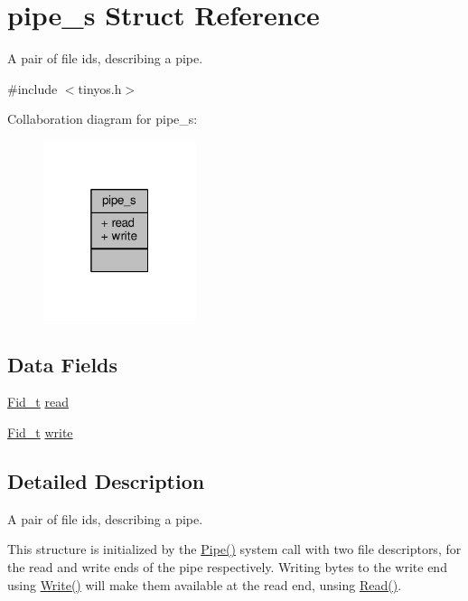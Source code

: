 \hypertarget{structpipe__s}{}\section{pipe\+\_\+s Struct Reference}
\label{structpipe__s}


A pair of file ids, describing a pipe.  




{\ttfamily \#include $<$tinyos.\+h$>$}



Collaboration diagram for pipe\+\_\+s\+:\nopagebreak
\begin{figure}[H]
\begin{center}
\leavevmode
\includegraphics[width=127pt]{structpipe__s__coll__graph}
\end{center}
\end{figure}
\subsection*{Data Fields}
\begin{DoxyCompactItemize}
\item 
\hyperlink{group__syscalls_ga5097222c5f0da97d92d4712359abc38f}{Fid\+\_\+t} \hyperlink{structpipe__s_ad0839b4f9b1fdb0241411952203f18aa}{read}
\item 
\hyperlink{group__syscalls_ga5097222c5f0da97d92d4712359abc38f}{Fid\+\_\+t} \hyperlink{structpipe__s_a69acc9cdf5f10195c43491e3ffa98cb1}{write}
\end{DoxyCompactItemize}


\subsection{Detailed Description}
A pair of file ids, describing a pipe. 

This structure is initialized by the {\ttfamily \hyperlink{group__syscalls_gab6355ce54e047c31538ed5ed9108b5b3}{Pipe()}} system call with two file descriptors, for the read and write ends of the pipe respectively. Writing bytes to the write end using {\ttfamily \hyperlink{group__syscalls_gaf046f003fde24f79fb395c250137856c}{Write()}} will make them available at the read end, unsing {\ttfamily \hyperlink{group__syscalls_ga3e9dc545a789eb45b2d356eabbac3ee3}{Read()}}. 

